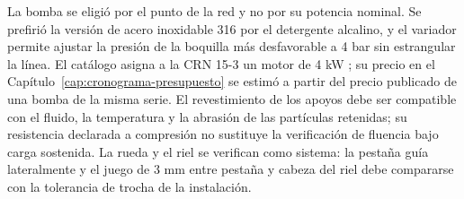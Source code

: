 La bomba se eligió por el punto de la red y no por su potencia nominal. Se prefirió la versión de acero inoxidable 316 por el detergente alcalino, y el variador permite ajustar la presión de la boquilla más desfavorable a 4 bar sin estrangular la línea. El catálogo asigna a la CRN 15-3 un motor de 4 kW \cite{grundfoscr}; su precio en el Capítulo~\ref{cap:cronograma-presupuesto} se estimó a partir del precio publicado de una bomba de la misma serie. El revestimiento de los apoyos debe ser compatible con el fluido, la temperatura y la abrasión de las partículas retenidas; su resistencia declarada a compresión no sustituye la verificación de fluencia bajo carga sostenida. La rueda y el riel se verifican como sistema: la pestaña guía lateralmente y el juego de 3 mm entre pestaña y cabeza del riel debe compararse con la tolerancia de trocha de la instalación.
